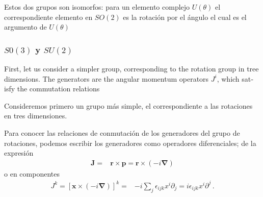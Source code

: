 Estos dos grupos son isomorfos: para un elemento complejo $U(\theta)$ el correspondiente elemento en $SO(2)$ es la rotación por el ángulo el cual es el argumento de $U(\theta)$
\subsubsection{$S0(3)$ y $SU(2)$}
\begin{english}
First, let us consider a simpler group, corresponding to the rotation group in tree dimensions. The generators are the angular momentum operators $J^i$, which satisfy the commutation relations
\end{english}
\begin{spanish}
Consideremos primero un grupo más simple, el correspondiente a las rotaciones en tres dimensiones. 
\end{spanish}
Para conocer las relaciones de conmutación de los generadores del grupo de rotaciones, podemos escribir los generadores como operadores diferenciales; de la expresión 
\begin{align}
  \mathbf{J}=&\mathbf{r}\times \mathbf{p}=\mathbf{r}\times (-i\boldsymbol{\nabla})
\end{align}
o en componentes
\begin{align}
\label{eq:rxpi}
  J^k=\left[\mathbf{x}\times (-i\boldsymbol{\nabla})\right]^k=&
-i\sum_j\epsilon_{ijk}x^i\partial_j=i\epsilon_{ijk}x^i\partial^j\,.
\end{align}

